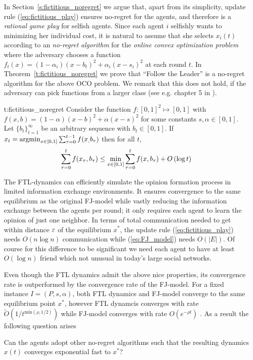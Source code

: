 In Section~\ref{s:fictitious_noregret} we argue that,
apart from its simplicity, update rule (\ref{eq:fictitious_play}) ensures
no-regret for the agents, and therefore is a \emph{rational game play} for selfish agents.
Since each agent $i$ selfishly wants to minimizing her individual cost,
it is natural to assume that she selects $x_i(t)$ according to
an \emph{no-regret algorithm} for the \emph{online convex optimization problem}
where the adversary chooses a function $f_t(x)=(1-\alpha_i)(x-b_t)^2 + \alpha_i(x-s_i)^2$
at each round $t$. In Theorem~\ref{t:fictitious_noregret}
we prove that \enquote{Follow the Leader} is a no-regret algorithm
for the above OCO problem. We remark that this does not hold,
if the adversary can pick functions from a larger class 
(see e.g. chapter 5 in \cite{Haz16}).

\begin{reptheorem}{t:fictitious_noregret}
  Consider the function $f:[0,1]^2 \mapsto [0,1]$ with
  $f(x,b) = (1-\alpha)(x-b)^2 + \alpha(x-s)^2$ for some
  constants $s,\alpha \in [0,1]$.
  Let $\{b_t\}_{t=1}^\infty$ be an arbitrary sequence with
  $b_t \in [0,1]$. If $x_t = \operatorname*{argmin}_{x \in [0,1]}\sum_{\tau=0}^{t-1}f(x_,b_\tau)$
  then for all $t$,
  \[
    \sum_{\tau=0}^{t}f(x_\tau,b_\tau) \leq
    \min_{x \in [0,1]}\sum_{\tau=0}^tf(x,b_\tau) + O\left(\log t\right)
  \]
\end{reptheorem}
The FTL-dynamics can efficiently simulate the opinion formation
process in limited information exchange environments.  It ensures
convergence to the same equilibrium as the original FJ-model
while vastly reducing the information exchange between the agents
per round; it only requires each agent to learn the opinion
of just one neighbor.
In terms of total communication needed to get within distance $\varepsilon$ of the
equilibrium $x^*$, the update rule (\ref{eq:fictitious_play}) needs
$O(n \log n)$ communication while (\ref{eq:FJ_model}) needs
$O(|E|)$.
Of course for this difference to be significant we need
each agent to have at least $O(\log n)$ friend which
not unusual in today's large social networks.

Even though the FTL dynamics admit the above
nice properties, its convergence rate is
outperformed by the convergence rate of the FJ-model. For
a fixed instance $I=(P,s,\alpha)$, both FTL dynamics and FJ-model
converge to the same equilibrium point $x^*$, however 
FTL dynamcis converges with rate
$\widetilde{O}(1/t^{\text{min}(\rho,1/2)})$ while FJ-model
converges with rate $O(e^{-\rho t})$ \cite{GS14}.
As a result the following question arises
\begin{question}
  Can the agents adopt other no-regret algorithms such that the resulting
  dynamics $x(t)$ converges exponential fast to $x^*$?
\end{question}

